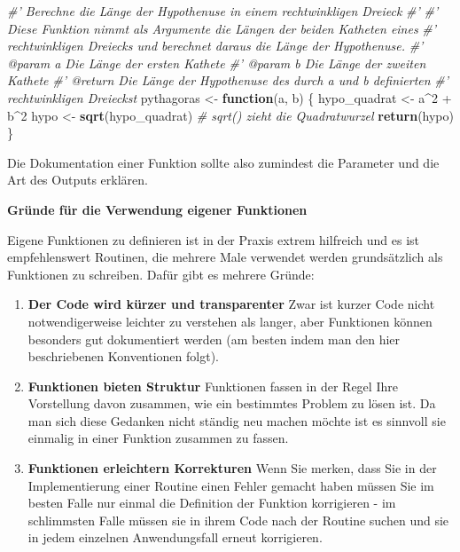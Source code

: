 \documentclass[]{tufte-book}
\newenvironment{Shaded}{}{}
\newcommand{\KeywordTok}[1]{\textcolor[rgb]{0.00,0.44,0.13}{\textbf{#1}}}
\newcommand{\DecValTok}[1]{\textcolor[rgb]{0.25,0.63,0.44}{#1}}
\newcommand{\StringTok}[1]{\textcolor[rgb]{0.25,0.44,0.63}{#1}}
\newcommand{\CommentTok}[1]{\textcolor[rgb]{0.38,0.63,0.69}{\textit{#1}}}
\newcommand{\ControlFlowTok}[1]{\textcolor[rgb]{0.00,0.44,0.13}{\textbf{#1}}}
\newcommand{\OperatorTok}[1]{\textcolor[rgb]{0.40,0.40,0.40}{#1}}
\newcommand{\NormalTok}[1]{#1}
\providecommand{\tightlist}{%
  \setlength{\itemsep}{0pt}\setlength{\parskip}{0pt}}
\begin{document}
\begin{Shaded}
\begin{Highlighting}[]
\CommentTok{#' Berechne die Länge der Hypothenuse in einem rechtwinkligen Dreieck}
\CommentTok{#' }
\CommentTok{#' Diese Funktion nimmt als Argumente die Längen der beiden Katheten eines}
\CommentTok{#'  rechtwinkligen Dreiecks und berechnet daraus die Länge der Hypothenuse.}
\CommentTok{#' @param a Die Länge der ersten Kathete}
\CommentTok{#' @param b Die Länge der zweiten Kathete}
\CommentTok{#' @return Die Länge der Hypothenuse des durch a und b definierten }
\CommentTok{#'  rechtwinkligen Dreieckst}
\NormalTok{pythagoras <-}\StringTok{ }\ControlFlowTok{function}\NormalTok{(a, b) \{}
\NormalTok{    hypo_quadrat <-}\StringTok{ }\NormalTok{a}\OperatorTok{^}\DecValTok{2} \OperatorTok{+}\StringTok{ }\NormalTok{b}\OperatorTok{^}\DecValTok{2}
\NormalTok{    hypo <-}\StringTok{ }\KeywordTok{sqrt}\NormalTok{(hypo_quadrat)  }\CommentTok{# sqrt() zieht die Quadratwurzel}
    \KeywordTok{return}\NormalTok{(hypo)}
\NormalTok{\}}
\end{Highlighting}
\end{Shaded}

Die Dokumentation einer Funktion sollte also zumindest die Parameter und
die Art des Outputs erklären.

\textbf{Gründe für die Verwendung eigener Funktionen}

Eigene Funktionen zu definieren ist in der Praxis extrem hilfreich und
es ist empfehlenswert Routinen, die mehrere Male verwendet werden
grundsätzlich als Funktionen zu schreiben. Dafür gibt es mehrere Gründe:

\begin{enumerate}
\def\labelenumi{\arabic{enumi}.}
\tightlist
\item
  \textbf{Der Code wird kürzer und transparenter} Zwar ist kurzer Code
  nicht notwendigerweise leichter zu verstehen als langer, aber
  Funktionen können besonders gut dokumentiert werden (am besten indem
  man den hier beschriebenen Konventionen folgt).
\item
  \textbf{Funktionen bieten Struktur} Funktionen fassen in der Regel
  Ihre Vorstellung davon zusammen, wie ein bestimmtes Problem zu lösen
  ist. Da man sich diese Gedanken nicht ständig neu machen möchte ist es
  sinnvoll sie einmalig in einer Funktion zusammen zu fassen.
\item
  \textbf{Funktionen erleichtern Korrekturen} Wenn Sie merken, dass Sie
  in der Implementierung einer Routine einen Fehler gemacht haben müssen
  Sie im besten Falle nur einmal die Definition der Funktion korrigieren
  - im schlimmsten Falle müssen sie in ihrem Code nach der Routine
  suchen und sie in jedem einzelnen Anwendungsfall erneut korrigieren.
\end{enumerate}
\end{document}
